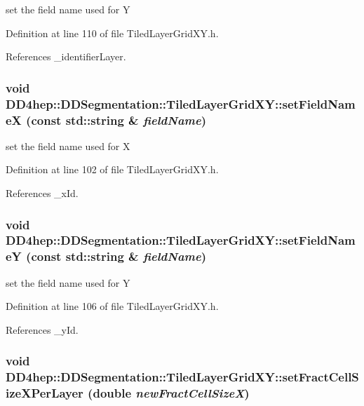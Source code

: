 set the field name used for Y 

Definition at line 110 of file TiledLayerGridXY.h.

References \_\-identifierLayer.\hypertarget{class_d_d4hep_1_1_d_d_segmentation_1_1_tiled_layer_grid_x_y_a1e0e7dc80968a2a7513cdd974275e5d5}{
\subsubsection[{setFieldNameX}]{\setlength{\rightskip}{0pt plus 5cm}void DD4hep::DDSegmentation::TiledLayerGridXY::setFieldNameX (const std::string \& {\em fieldName})}}
\label{class_d_d4hep_1_1_d_d_segmentation_1_1_tiled_layer_grid_x_y_a1e0e7dc80968a2a7513cdd974275e5d5}


set the field name used for X 

Definition at line 102 of file TiledLayerGridXY.h.

References \_\-xId.\hypertarget{class_d_d4hep_1_1_d_d_segmentation_1_1_tiled_layer_grid_x_y_a8e33e4196b585e5376e871818e784bfa}{
\subsubsection[{setFieldNameY}]{\setlength{\rightskip}{0pt plus 5cm}void DD4hep::DDSegmentation::TiledLayerGridXY::setFieldNameY (const std::string \& {\em fieldName})}}
\label{class_d_d4hep_1_1_d_d_segmentation_1_1_tiled_layer_grid_x_y_a8e33e4196b585e5376e871818e784bfa}


set the field name used for Y 

Definition at line 106 of file TiledLayerGridXY.h.

References \_\-yId.\hypertarget{class_d_d4hep_1_1_d_d_segmentation_1_1_tiled_layer_grid_x_y_a89afa525c07a985c490e593f84961d7c}{
\subsubsection[{setFractCellSizeXPerLayer}]{\setlength{\rightskip}{0pt plus 5cm}void DD4hep::DDSegmentation::TiledLayerGridXY::setFractCellSizeXPerLayer (double {\em newFractCellSizeX})}}
\label{class_d_d4hep_1_1_d_d_segmentation_1_1_tiled_layer_grid_x_y_a89afa525c07a985c490e593f84961d7c}


